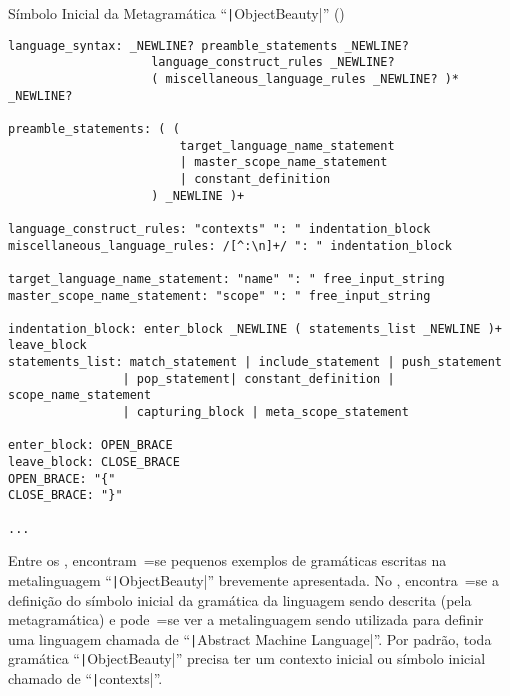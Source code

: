 \begin{code}
\caption[Símbolo Inicial da Metagramática ``ObjectBeauty'']{Símbolo Inicial da Metagramática ``\texttt|ObjectBeauty|'' ()}
\label{code:simboloInicialDaMetagramatica}
\begin{verbatim}
language_syntax: _NEWLINE? preamble_statements _NEWLINE?
                    language_construct_rules _NEWLINE?
                    ( miscellaneous_language_rules _NEWLINE? )* _NEWLINE?

preamble_statements: ( (
                        target_language_name_statement
                        | master_scope_name_statement
                        | constant_definition
                    ) _NEWLINE )+

language_construct_rules: "contexts" ": " indentation_block
miscellaneous_language_rules: /[^:\n]+/ ": " indentation_block

target_language_name_statement: "name" ": " free_input_string
master_scope_name_statement: "scope" ": " free_input_string

indentation_block: enter_block _NEWLINE ( statements_list _NEWLINE )+ leave_block
statements_list: match_statement | include_statement | push_statement
                | pop_statement| constant_definition | scope_name_statement
                | capturing_block | meta_scope_statement

enter_block: OPEN_BRACE
leave_block: CLOSE_BRACE
OPEN_BRACE: "{"
CLOSE_BRACE: "}"

...
\end{verbatim}
\end{code}

Entre os ,
encontram~=se pequenos exemplos de gramáticas escritas na metalinguagem ``\texttt|ObjectBeauty|'' brevemente apresentada.
No ,
encontra~=se a definição do símbolo inicial da gramática da linguagem sendo descrita (pela metagramática) e
pode~=se ver a metalinguagem sendo utilizada para definir uma linguagem chamada de ``\texttt|Abstract Machine Language|''.
Por padrão,
toda gramática ``\texttt|ObjectBeauty|'' precisa ter um contexto inicial ou
símbolo inicial chamado de ``\texttt|contexts|''.

